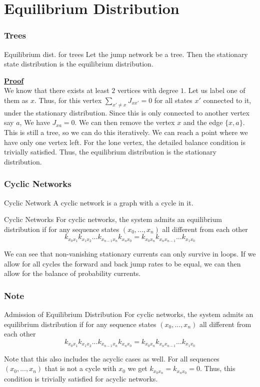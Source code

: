 \documentclass[9pt]{beamer}
\begin{document}
\section{Equilibrium Distribution}
\begin{frame}
    \frametitle{Trees}
    \begin{block}{Equilibrium dist. for trees}
      Let the jump network be a tree. Then the stationary state distribution is the equilibrium distribution.
      \end{block}
      \underline{\textbf{Proof}}\\
      We know that there exists at least $2$ vertices with degree $1$. Let us label one of them as $x$.
      Thus, for this vertex $\sum_{x' \neq x} J_{xx'} = 0$ for all states $x'$ connected to it, under the stationary distribution.
      Since this is only connected to another vertex say $a$, We have $J_{xa} = 0$. We can then remove the vertex $x$ and the edge $\{x,a\}$.
      This is still a tree, so we can do this iteratively. We can reach a point where we have only one vertex left. For the lone vertex,
      the detailed balance condition is trivially satisfied. Thus, the equilibrium distribution is the stationary distribution.

      \hfill \square

    
  
\end{frame}
\begin{frame}
  \frametitle{Cyclic Networks}
  \begin{block}{Cyclic Network}
    A cyclic network is a graph with a cycle in it.
  \end{block}
  \begin{block}{Cyclic Networks}
    For cyclic networks, the system admits an equilibrium distribution if 
    for any sequence states $(x_0,...,x_n)$ all different from each other
    $$k_{x_0x_1}k_{x_1x_2}...k_{x_{n-1}x_n}k_{x_nx_0} = k_{x_0x_n}k_{x_nx_{n-1}}...k_{x_1x_0}$$
    \end{block}
    We can see that non-vanishing stationary currents can only survive in loops. If we allow for all cycles the forward and back jump rates to be equal, we can then allow for 
    the balance of probability currents.

\end{frame}

\begin{frame}
  \frametitle{Note}
  \begin{block}{Admission of Equilibrium Distribution}
    For cyclic networks, the system admits an equilibrium distribution if 
    for any sequence states $(x_0,...,x_n)$ all different from each other
    $$k_{x_0x_1}k_{x_1x_2}...k_{x_{n-1}x_n}k_{x_nx_0} = k_{x_0x_n}k_{x_nx_{n-1}}...k_{x_1x_0}$$
    \end{block}
    Note that this also includes the acyclic cases as well. For all sequences $(x_0,...,x_n)$ that is not a cycle with $x_0$
    we  get $k_{x_0 x_n} = k_{x_n x_0} = 0$. Thus, this condition is trivially satisfied for acyclic networks.
\end{frame}
\end{document}
